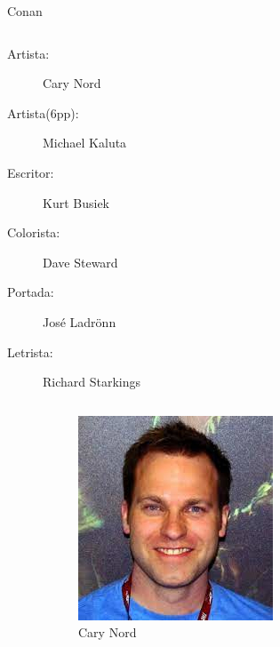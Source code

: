 \begin{frame}{Conan}
\begin{columns}
\begin{itemize}
         \begin{description}
            \item[Artista:] Cary Nord
            \item[Artista(6pp):] Michael Kaluta
            \item[Escritor:] Kurt Busiek
            \item[Colorista:] Dave Steward
            \item[Portada:] José Ladrönn
            \item[Letrista:] Richard Starkings
         \end{description}
    \end{itemize}
\end{columns}
\end{frame}

\begin{frame}{}
\begin{figure}[htp]
 \centering
 \begin{subfigure}[b]{0.17\textwidth}
   \includegraphics[width=\textwidth]{img/artistas/CaryNord}
   \caption{Cary Nord}
 \end{subfigure}
~
 \begin{subfigure}[b]{0.17\textwidth}

\end{subfigure}
\end{figure}
\end{frame}
